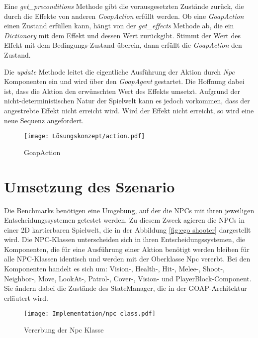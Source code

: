 Eine \textit{get\_preconditions} Methode gibt die vorausgesetzten Zustände zurück, die durch die Effekte von anderen \textit{GoapAction} erfüllt werden. Ob eine \textit{GoapAction} einen Zustand erfüllen kann, hängt von der \textit{get\_effects} Methode ab, die ein \textit{Dictionary} mit dem Effekt und dessen Wert zurückgibt. Stimmt der Wert des Effekt mit dem Bedingungs-Zustand überein, dann erfüllt die \textit{GoapAction} den Zustand.

Die \textit{update} Methode leitet die eigentliche Ausführung der Aktion durch \textit{Npc} Komponenten ein und wird über den \textit{GoapAgent} gestartet. Die Hoffnung dabei ist, dass die Aktion den erwünschten Wert des Effekts umsetzt. Aufgrund der nicht-deterministischen Natur der Spielwelt kann es jedoch vorkommen, dass der angestrebte Effekt nicht erreicht wird. Wird der Effekt nicht erreicht, so wird eine neue Sequenz angefordert.

\begin{figure}[h]
  \centering
  \texttt{[image: Lösungskonzept/action.pdf]}
	\captionsetup{justification=justified, format=plain}
  \caption{GoapAction}
  \label{fig:GoapAction}
\end{figure}








\section{Umsetzung des Szenario}
\label{chap:implementierung szenario}

Die Benchmarks benötigen eine Umgebung, auf der die NPCs mit ihren jeweiligen Entscheidungssystemen getestet werden. Zu diesem Zweck agieren die NPCs in einer 2D kartierbaren Spielwelt, die in der Abbildung \ref{fig:ego shooter} dargestellt wird. Die NPC-Klassen unterscheiden sich in ihren Entscheidungssystemen, die Komponenten, die für eine Ausführung einer Aktion benötigt werden bleiben für alle NPC-Klassen identisch und werden mit der Oberklasse Npc vererbt. Bei den Komponenten handelt es sich um: Vision-, Health-, Hit-, Melee-, Shoot-, Neighbor-, Move, LookAt-, Patrol-, Cover-, Vision- und PlayerBlock-Component. Sie ändern dabei die Zustände des StateManager, die in der GOAP-Architektur erläutert wird.

\begin{figure}[h]
  \centering
  \texttt{[image: Implementation/npc class.pdf]}
	\captionsetup{justification=justified, format=plain}
  \caption{Vererbung der Npc Klasse}
  \label{fig:npc class}
\end{figure}

